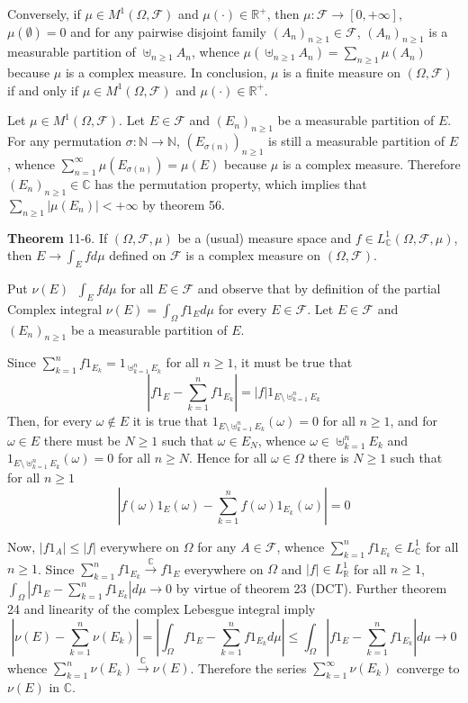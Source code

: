 \documentclass[a4paper]{article}
\newcommand{\clo}[1]{\left [ #1 \right ]}
\newcommand{\brac}[1]{\left ( #1 \right )}
\newcommand{\abs}[1]{\left | #1 \right |}
\newcommand{\Real}{\mathbb{R}}
\newcommand{\Zinf}{\clo{ 0, +\infty }}
\newcommand{\Cplx}{\mathbb{C}}
\newcommand{\Fcal}{\mathcal{F}}
\newcommand{\defn}{\mathop{\overset{\Delta}{=}}\nolimits}
\begin{document}
Conversely, if $\mu\in M^1\brac{\Omega, \Fcal}$ and $\mu\brac{\cdot}\in \Real^+$, then $\mu:\Fcal\to\Zinf$, $\mu\brac{\emptyset}=0$ and for any pairwise disjoint family $\brac{A_n}_{n\geq 1}\in \Fcal$, $\brac{A_n}_{n\geq 1}$ is a measurable partition of $\uplus_{n\geq 1} A_n$, whence $\mu\brac{\uplus_{n\geq 1} A_n}=\sum_{n\geq 1} \mu\brac{A_n}$ because $\mu$ is a complex measure. In conclusion, $\mu$ is a finite measure on $\brac{\Omega, \Fcal}$ if and only if $\mu\in M^1\brac{\Omega, \Fcal}$ and $\mu\brac{\cdot}\in \Real^+$.

Let $\mu\in M^1\brac{\Omega, \Fcal}$. Let $E\in \Fcal$ and $\brac{E_n}_{n\geq 1}$ be a measurable partition of $E$. For any permutation $\sigma:\mathbb{N}\to\mathbb{N}$, $\brac{E_{\sigma\brac{n}}}_{n\geq 1}$ is still a measurable partition of $E$, whence $\sum_{n=1}^\infty \mu\brac{E_{\sigma\brac{n}}} = \mu\brac{E}$ because $\mu$ is a complex measure. Therefore $\brac{E_n}_{n\geq 1}\in \Cplx$ has the permutation property, which implies that $\sum_{n\geq 1} \abs{\mu\brac{E_n}}<+\infty$ by theorem 56.

\label{thm:cplx_int_is_cplx_meas} \noindent \textbf{Theorem} 11-6.
If $\brac{\Omega, \Fcal, \mu}$ be a (usual) measure space and $f\in L^1_\Cplx\brac{\Omega, \Fcal, \mu}$, then $E\to \int_E f d\mu$ defined on $\Fcal$ is a complex measure on $\brac{\Omega, \Fcal}$.

Put $\nu\brac{E}\defn \int_E f d\mu$ for all $E\in \Fcal$ and observe that by definition of the partial Complex integral $\nu\brac{E}=\int_\Omega f 1_E d\mu$ for every $E\in \Fcal$. Let $E\in \Fcal$ and $\brac{E_n}_{n\geq 1}$ be a measurable partition of $E$.

Since $\sum_{k=1}^n f 1_{E_k} = 1_{\uplus_{k=1}^n E_k}$ for all $n\geq 1$, it must be true that \[\abs{f 1_E - \sum_{k=1}^n f 1_{E_k} } = \abs{f} 1_{E\setminus {\uplus_{k=1}^n E_k}}\] Then, for every $\omega\notin E$ it is true that $1_{E\setminus {\uplus_{k=1}^n E_k}}\brac{\omega}=0$ for all $n\geq 1$, and for $\omega\in E$ there must be $N\geq 1$ such that $\omega\in E_N$, whence $\omega\in \uplus_{k=1}^n E_k$ and $1_{E\setminus {\uplus_{k=1}^n E_k}}\brac{\omega}=0$ for all $n\geq N$. Hence for all $\omega\in \Omega$ there is $N\geq 1$ such that for all $n\geq 1$ \[\abs{f\brac{\omega} 1_E\brac{\omega} - \sum_{k=1}^n f \brac{\omega}1_{E_k}\brac{\omega} } = 0\]

Now, $\abs{f 1_A}\leq \abs{f}$ everywhere on $\Omega$ for any $A\in \Fcal$, whence $\sum_{k=1}^n f 1_{E_k}\in L^1_\Cplx$ for all $n\geq 1$. Since $\sum_{k=1}^n f 1_{E_k}\overset{\Cplx}{\to} f 1_E$ everywhere on $\Omega$ and $\abs{f}\in L^1_\Real$ for all $n\geq 1$, $\int_\Omega \abs{f 1_E - \sum_{k=1}^n f 1_{E_k} } d\mu \to 0$ by virtue of theorem 23 (DCT). Further theorem 24 and linearity of the complex Lebesgue integral imply \[\abs{\nu\brac{E} - \sum_{k=1}^n \nu\brac{E_k} } = \abs{ \int_\Omega f 1_E - \sum_{k=1}^n f 1_{E_k} d\mu }\leq \int_\Omega \abs{f 1_E - \sum_{k=1}^n f 1_{E_k} } d\mu \to 0\] whence $\sum_{k=1}^n \nu\brac{E_k}\overset{\Cplx}{\to} \nu\brac{E}$. Therefore the series $\sum_{k=1}^\infty \nu\brac{E_k}$ converge to $\nu\brac{E}$ in $\Cplx$.\\
\end{document}
